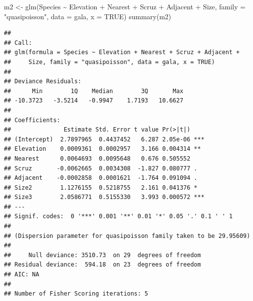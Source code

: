 \documentclass[
  ignorenonframetext,
]{beamer}
\newenvironment{Shaded}{\begin{snugshade}}{\end{snugshade}}
\newcommand{\AttributeTok}[1]{\textcolor[rgb]{0.77,0.63,0.00}{#1}}
\newcommand{\ConstantTok}[1]{\textcolor[rgb]{0.00,0.00,0.00}{#1}}
\newcommand{\FunctionTok}[1]{\textcolor[rgb]{0.00,0.00,0.00}{#1}}
\newcommand{\NormalTok}[1]{#1}
\newcommand{\OtherTok}[1]{\textcolor[rgb]{0.56,0.35,0.01}{#1}}
\newcommand{\SpecialCharTok}[1]{\textcolor[rgb]{0.00,0.00,0.00}{#1}}
\newcommand{\StringTok}[1]{\textcolor[rgb]{0.31,0.60,0.02}{#1}}
\begin{document}
\begin{frame}[fragile]{}
\protect\hypertarget{section-5}{}
\tiny

\begin{Shaded}
\begin{Highlighting}[]
\NormalTok{m2 }\OtherTok{\textless{}{-}} \FunctionTok{glm}\NormalTok{(Species }\SpecialCharTok{\textasciitilde{}}\NormalTok{ Elevation }\SpecialCharTok{+}\NormalTok{ Nearest }\SpecialCharTok{+}\NormalTok{ Scruz }\SpecialCharTok{+}\NormalTok{ Adjacent }\SpecialCharTok{+}\NormalTok{ Size, }
          \AttributeTok{family =} \StringTok{"quasipoisson"}\NormalTok{, }\AttributeTok{data =}\NormalTok{ gala, }\AttributeTok{x =} \ConstantTok{TRUE}\NormalTok{)}
\FunctionTok{summary}\NormalTok{(m2)}
\end{Highlighting}
\end{Shaded}

\begin{verbatim}
## 
## Call:
## glm(formula = Species ~ Elevation + Nearest + Scruz + Adjacent + 
##     Size, family = "quasipoisson", data = gala, x = TRUE)
## 
## Deviance Residuals: 
##      Min        1Q    Median        3Q       Max  
## -10.3723   -3.5214   -0.9947    1.7193   10.6627  
## 
## Coefficients:
##               Estimate Std. Error t value Pr(>|t|)    
## (Intercept)  2.7897965  0.4437452   6.287 2.05e-06 ***
## Elevation    0.0009361  0.0002957   3.166 0.004314 ** 
## Nearest      0.0064693  0.0095648   0.676 0.505552    
## Scruz       -0.0062665  0.0034308  -1.827 0.080777 .  
## Adjacent    -0.0002858  0.0001621  -1.764 0.091094 .  
## Size2        1.1276155  0.5218755   2.161 0.041376 *  
## Size3        2.0586771  0.5155330   3.993 0.000572 ***
## ---
## Signif. codes:  0 '***' 0.001 '**' 0.01 '*' 0.05 '.' 0.1 ' ' 1
## 
## (Dispersion parameter for quasipoisson family taken to be 29.95609)
## 
##     Null deviance: 3510.73  on 29  degrees of freedom
## Residual deviance:  594.18  on 23  degrees of freedom
## AIC: NA
## 
## Number of Fisher Scoring iterations: 5
\end{verbatim}
\end{frame}
\end{document}

